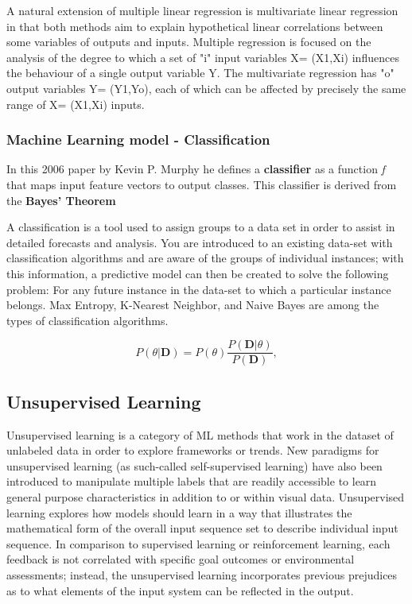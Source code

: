 A natural extension of multiple linear regression is multivariate linear regression in that both methods aim to explain hypothetical linear correlations between some variables of outputs and inputs. Multiple regression is focused on the analysis of the degree to which a set of "i" input variables X= (X1,Xi) influences the behaviour of a single output variable Y. The multivariate regression has "o" output variables Y= (Y1,Yo), each of which can be affected by precisely the same range of X= (X1,Xi) inputs.\cite{izenman2013multivariate}


\subsubsection{Machine Learning model - Classification}

In this 2006 paper by Kevin P. Murphy \cite{murphy2006naive} he defines a \textbf{classifier} as a function \textit{f} that maps input feature vectors to output classes. This classifier is derived from the \textbf{Bayes' Theorem}

A classification is a tool used to assign groups to a data set in order to assist in detailed forecasts and analysis. You are introduced to an existing data-set with classification algorithms and are aware of the groups of individual instances; with this information, a predictive model can then be created to solve the following problem: For any future instance in the data-set to which a particular instance belongs. Max Entropy, K-Nearest Neighbor, and Naive Bayes are among the types of classification algorithms.



\begin{equation}
	\label{eq:bayes}
	P(\theta | \textbf{D}) = P(\theta ) \frac{P(\textbf{D} |\theta)}{P(\textbf{D})},
\end{equation}



\subsection{Unsupervised Learning}
Unsupervised learning is a category of ML methods that work in the dataset of unlabeled data in order to explore frameworks or trends. New paradigms for unsupervised learning (as such-called self-supervised learning) have also been introduced to manipulate multiple labels that are readily accessible to learn general purpose characteristics in addition to or within visual data.\cite{dayan1999unsupervised}
Unsupervised learning explores how models should learn in a way that illustrates the mathematical form of the overall input sequence set to describe individual input sequence. In comparison to supervised learning or reinforcement learning, each feedback is not correlated with specific goal outcomes or environmental assessments; instead, the unsupervised learning incorporates previous prejudices as to what elements of the input system can be reflected in the output.\cite{dayan1999unsupervised}



